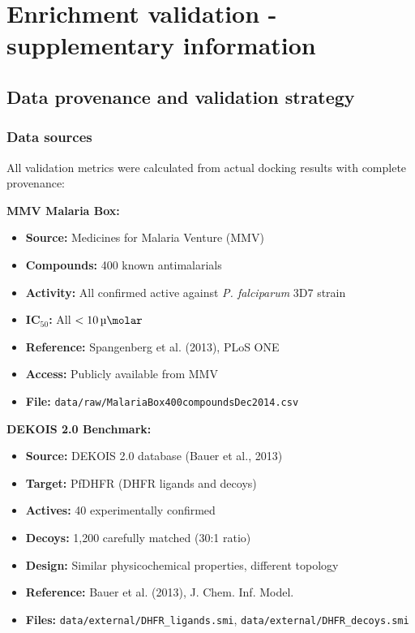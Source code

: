 \documentclass[journal=jcisd8,manuscript=suppinfo]{achemso}
\begin{document}
\clearpage

\section*{Enrichment validation - supplementary information}

\subsection*{Data provenance and validation strategy}

\subsubsection*{Data sources}

All validation metrics were calculated from actual docking results with complete provenance:

\textbf{MMV Malaria Box:}
\begin{itemize}
  \item \textbf{Source:} Medicines for Malaria Venture (MMV)
  \item \textbf{Compounds:} 400 known antimalarials
  \item \textbf{Activity:} All confirmed active against \textit{P. falciparum} 3D7 strain
  \item \textbf{IC$_{50}$:} All $< \qty{10}{\micro\molar}$
  \item \textbf{Reference:} Spangenberg et al. (2013), PLoS ONE
  \item \textbf{Access:} Publicly available from MMV
  \item \textbf{File:} \texttt{data/raw/MalariaBox400compoundsDec2014.csv}
\end{itemize}

\textbf{DEKOIS 2.0 Benchmark:}
\begin{itemize}
  \item \textbf{Source:} DEKOIS 2.0 database (Bauer et al., 2013)
  \item \textbf{Target:} PfDHFR (DHFR ligands and decoys)
  \item \textbf{Actives:} 40 experimentally confirmed
  \item \textbf{Decoys:} 1,200 carefully matched (30:1 ratio)
  \item \textbf{Design:} Similar physicochemical properties, different topology
  \item \textbf{Reference:} Bauer et al. (2013), J. Chem. Inf. Model.
  \item \textbf{Files:} \texttt{data/external/DHFR\_ligands.smi}, \texttt{data/external/DHFR\_decoys.smi}
\end{itemize}
\end{document}
